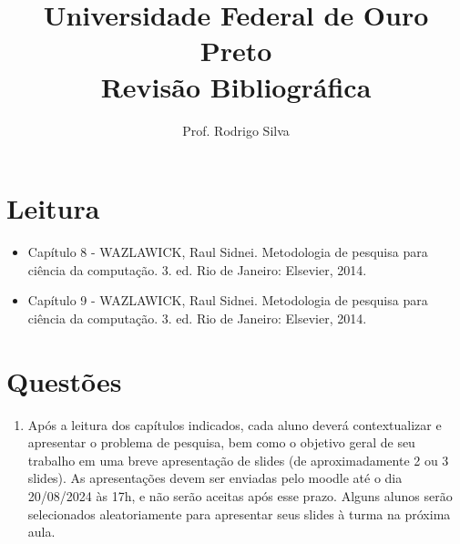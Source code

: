 \documentclass{article}
\title{\vspace{-2 cm}Universidade Federal de Ouro Preto \\ Revisão Bibliográfica}
\author{Prof. Rodrigo Silva}
\date{}
\begin{document}
\maketitle

\section{Leitura}

\begin{itemize}
    \item Capítulo 8 - WAZLAWICK, Raul Sidnei. Metodologia de pesquisa para ciência da computação. 3. ed. Rio de Janeiro: Elsevier, 2014.
    \item Capítulo 9 - WAZLAWICK, Raul Sidnei. Metodologia de pesquisa para ciência da computação. 3. ed. Rio de Janeiro: Elsevier, 2014.
\end{itemize}

\section{Questões}

\begin{enumerate}
\item Após a leitura dos capítulos indicados, cada aluno deverá contextualizar e apresentar o problema de pesquisa, bem como o objetivo geral de seu trabalho em uma breve apresentação de slides (de aproximadamente 2 ou 3 slides). As apresentações devem ser enviadas pelo moodle até o dia 20/08/2024 às 17h, e não serão aceitas após esse prazo. Alguns alunos serão selecionados aleatoriamente para apresentar seus slides à turma na próxima aula.
\end{enumerate}


%
%
\end{document}
